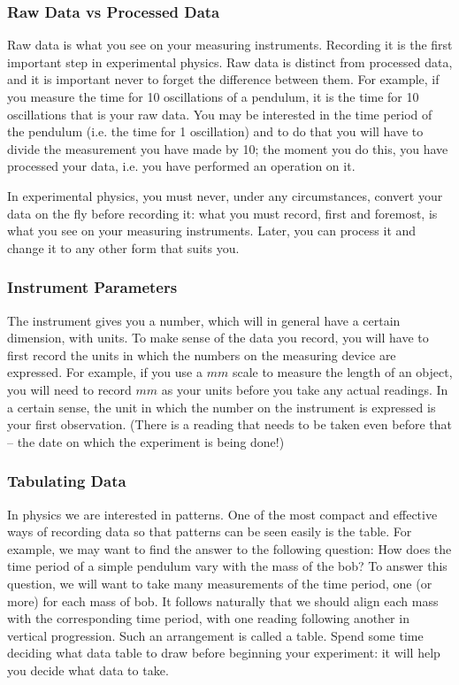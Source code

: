 \subsubsection{Raw Data vs Processed Data}

Raw data is what you see on your measuring instruments. Recording it is the first important step in experimental physics. Raw data is distinct from processed data, and it is important never to forget the difference between them. For example, if you measure the time for 10 oscillations of a pendulum, it is the time for 10 oscillations that is your raw data. You may be interested in the time period of the pendulum (i.e. the time for 1 oscillation) and to do that you will have to divide the measurement you have made by 10; the moment you do this, you have processed your data, i.e. you have performed an operation on it. 
\begin{imp}
In experimental physics, you must never, under any circumstances, convert your data on the fly before recording it: what you must record, first and foremost, is what you see on your measuring instruments. Later, you can process it and change it to any other form that suits you. 
\end{imp}

\subsubsection{Instrument Parameters}

The instrument gives you a number, which will in general have a certain dimension, with units. To make sense of the data you record, you will have to first record the units in which the numbers on the measuring device are expressed. For example, if you use a $mm$ scale to measure the length of an object, you will need to record $mm$ as your units before you take any actual readings. In a certain sense, the unit in which the number on the instrument is expressed is your first observation. (There is a reading that needs to be taken even before that -- the date on which the experiment is being done!)

\subsubsection{Tabulating Data}

In physics we are interested in patterns. One of the most compact and effective ways of recording data so that patterns can be seen easily is the table. For example, we may want to find the answer to the following question: How does the time period of a simple pendulum vary with the mass of the bob? To answer this question, we will want to take many measurements of the time period, one (or more) for each mass of bob. It follows naturally that we should align each mass with the corresponding time period, with one reading following another in vertical progression. Such an arrangement is called a table. Spend some time deciding what data table to draw before beginning your experiment: it will help you decide what data to take.

